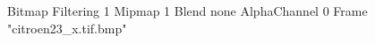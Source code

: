 {Bitmap
	{Filtering 1}
	{Mipmap 1}
	{Blend none}
	{AlphaChannel 0}
	{Frame "citroen23_x.tif.bmp"}
}
